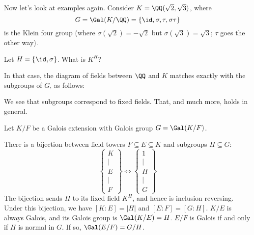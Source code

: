 Now let's look at examples again.
Consider $K = \QQ(\sqrt2, \sqrt3)$,
where \[ G = \Gal(K/\QQ) = \{\id, \sigma, \tau, \sigma\tau\} \]
is the Klein four group
(where $\sigma(\sqrt2) = -\sqrt 2$ but $\sigma(\sqrt 3) = \sqrt 3$; $\tau$ goes the other way).
\begin{ques}
	Let $H = \{\id, \sigma\}$. What is $K^H$?
\end{ques}
In that case, the diagram of fields between $\QQ$ and $K$
matches exactly with the subgroups of $G$, as follows:
\begin{center}
\end{center}
We see that subgroups correspond to fixed fields.
That, and much more, holds in general.

\begin{theorem}
	Let $K/F$ be a Galois extension with Galois group $G = \Gal(K/F)$.
	\begin{enumerate}[(a)]
	\ii There is a bijection between field towers $F \subseteq E \subseteq K$ and subgroups $H \subseteq G$:
	\[
		\left\{
		\begin{array}{c}
			K \\ \mid \\ E \\ \mid \\ F
		\end{array}
		\right\}
		\iff
		\left\{
		\begin{array}{c}
			1 \\ \mid \\ H \\ \mid \\ G
		\end{array}
		\right\}
	\]
	The bijection sends $H$ to its fixed field $K^H$, and hence is inclusion reversing.
	\ii Under this bijection, we have $[K:E] = \left\lvert H \right\rvert$ and $[E:F] = [G:H]$.
	\ii $K/E$ is always Galois, and its Galois group is $\Gal(K/E) = H$.
	\ii $E/F$ is Galois if and only if $H$ is normal in $G$. If so, $\Gal(E/F) = G/H$.
	\end{enumerate}
\end{theorem}

